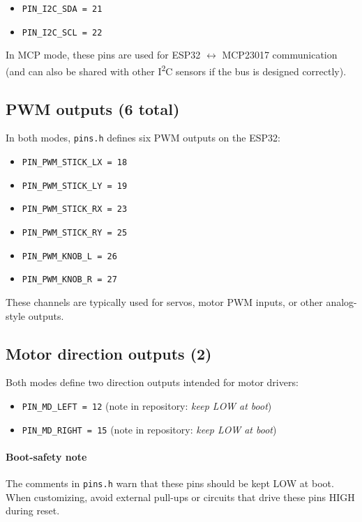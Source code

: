 \begin{itemize}
    \item \texttt{PIN\_I2C\_SDA = 21}
    \item \texttt{PIN\_I2C\_SCL = 22}
\end{itemize}

In MCP mode, these pins are used for ESP32 $\leftrightarrow$ MCP23017 communication (and can also be shared with other
I\textsuperscript{2}C sensors if the bus is designed correctly).

\subsection{PWM outputs (6 total)}
In both modes, \texttt{pins.h} defines six PWM outputs on the ESP32:

\begin{itemize}
    \item \texttt{PIN\_PWM\_STICK\_LX = 18}
    \item \texttt{PIN\_PWM\_STICK\_LY = 19}
    \item \texttt{PIN\_PWM\_STICK\_RX = 23}
    \item \texttt{PIN\_PWM\_STICK\_RY = 25}
    \item \texttt{PIN\_PWM\_KNOB\_L = 26}
    \item \texttt{PIN\_PWM\_KNOB\_R = 27}
\end{itemize}

These channels are typically used for servos, motor PWM inputs, or other analog-style outputs.

\subsection{Motor direction outputs (2)}
Both modes define two direction outputs intended for motor drivers:

\begin{itemize}
    \item \texttt{PIN\_MD\_LEFT = 12} \quad (note in repository: \emph{keep LOW at boot})
    \item \texttt{PIN\_MD\_RIGHT = 15} \quad (note in repository: \emph{keep LOW at boot})
\end{itemize}

\paragraph{Boot-safety note}
The comments in \texttt{pins.h} warn that these pins should be kept LOW at boot. When customizing,
avoid external pull-ups or circuits that drive these pins HIGH during reset.

